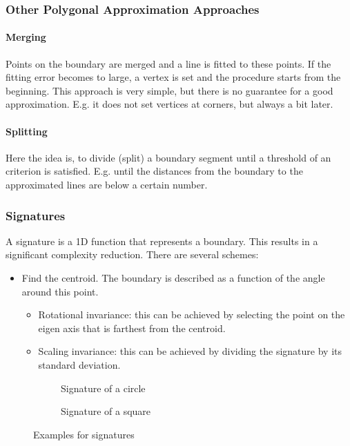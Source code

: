 \subsubsection{Other Polygonal Approximation Approaches}
\paragraph{Merging}
Points on the boundary are merged and a line is fitted to these points. 
If the fitting error becomes to large, a vertex is set and the procedure starts from the beginning.
This approach is very simple, but there is no guarantee for a good approximation.
E.g. it does not set vertices at corners, but always a bit later. 

\paragraph{Splitting}
Here the idea is, to divide (split) a boundary segment until a threshold of an criterion is satisfied.
E.g. until the distances from the boundary to the approximated lines are below a certain number.

\subsubsection{Signatures}
A signature is a 1D function that represents a boundary. This results in a significant complexity reduction. There are several schemes:\\
\begin{itemize}
\item Find the centroid. The boundary is described as a function of the angle around this point.
\begin{itemize}
\item Rotational invariance: this can be achieved by selecting the point on the eigen axis that is farthest from the centroid.
\item Scaling invariance: this can be achieved by dividing the signature by its standard deviation.
\end{itemize}
\end{itemize}
\begin{figure}[h]
	\begin{subfigure}{0.5\textwidth}
		\centering
		
		\caption{Signature of a circle}
	\end{subfigure}
	\begin{subfigure}{0.5\textwidth}
		\centering
		
		\caption{Signature of a square}
	\end{subfigure}
	\caption{Examples for signatures}
\end{figure}

